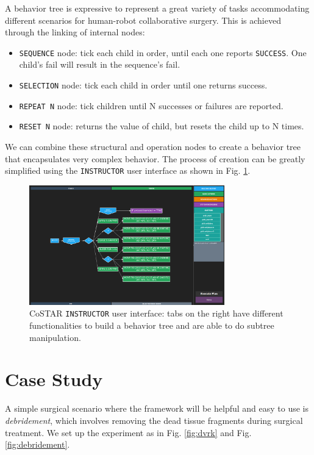 \documentclass[letterpaper, 10 pt, conference]{ieeeconf}
\begin{document}
A behavior tree is expressive to represent a great variety of tasks accommodating different scenarios for human-robot collaborative surgery. This is achieved through the linking of internal nodes:
 
\begin{itemize}
\item \texttt{SEQUENCE} node: tick each child in order, until each one reports \texttt{SUCCESS}. One child's fail will result in the sequence's fail.
\item \texttt{SELECTION} node: tick each child in order until one returns success.
\item \texttt{REPEAT N} node: tick children until N successes or failures are reported.
\item \texttt{RESET N} node: returns the value of child, but resets the child up to N times.
\end{itemize} 

We can combine these structural and operation nodes to create a behavior tree that encapsulates very complex behavior. The process of creation can be greatly simplified using the \texttt{INSTRUCTOR} user interface as shown in Fig. \ref{fig:instructor}.

\begin{figure}[bt]
\centering
\includegraphics[width=240pt]{instructor2.png}
\caption{CoSTAR \texttt{INSTRUCTOR} user interface: tabs on the right have different functionalities to build a behavior tree and are able to do subtree manipulation. }
\label{fig:instructor}
\end{figure}


\section{Case Study}
A simple surgical scenario where the framework will be helpful and easy to use is \textit{debridement}, which involves removing the dead tissue fragments during surgical treatment. We set up the experiment \cite{video} as in Fig. \ref{fig:dvrk} and Fig. \ref{fig:debridement}. 
\end{document}
